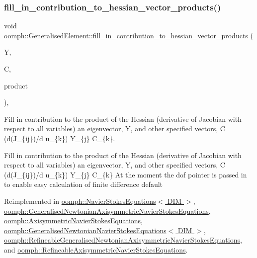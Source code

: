 \subsubsection{\texorpdfstring{fill\+\_\+in\+\_\+contribution\+\_\+to\+\_\+hessian\+\_\+vector\+\_\+products()}{fill\_in\_contribution\_to\_hessian\_vector\_products()}}
{\footnotesize\ttfamily void oomph\+::\+Generalised\+Element\+::fill\+\_\+in\+\_\+contribution\+\_\+to\+\_\+hessian\+\_\+vector\+\_\+products (\begin{DoxyParamCaption}\item[{\hyperlink{classoomph_1_1Vector}{Vector}$<$ double $>$ const \&}]{Y,  }\item[{\hyperlink{classoomph_1_1DenseMatrix}{Dense\+Matrix}$<$ double $>$ const \&}]{C,  }\item[{\hyperlink{classoomph_1_1DenseMatrix}{Dense\+Matrix}$<$ double $>$ \&}]{product }\end{DoxyParamCaption})\hspace{0.3cm}{\ttfamily [protected]}, {\ttfamily [virtual]}}



Fill in contribution to the product of the Hessian (derivative of Jacobian with respect to all variables) an eigenvector, Y, and other specified vectors, C (d(J\+\_\+\{ij\})/d u\+\_\+\{k\}) Y\+\_\+\{j\} C\+\_\+\{k\}. 

Fill in contribution to the product of the Hessian (derivative of Jacobian with respect to all variables) an eigenvector, Y, and other specified vectors, C (d(J\+\_\+\{ij\})/d u\+\_\+\{k\}) Y\+\_\+\{j\} C\+\_\+\{k\} At the moment the dof pointer is passed in to enable easy calculation of finite difference default 

Reimplemented in \hyperlink{classoomph_1_1NavierStokesEquations_a2bb1a43a7f60aafbfd2de233b539c3f0}{oomph\+::\+Navier\+Stokes\+Equations$<$ D\+I\+M $>$}, \hyperlink{classoomph_1_1GeneralisedNewtonianAxisymmetricNavierStokesEquations_a2087bbf2d46364b9dc414a7ca90f25de}{oomph\+::\+Generalised\+Newtonian\+Axisymmetric\+Navier\+Stokes\+Equations}, \hyperlink{classoomph_1_1AxisymmetricNavierStokesEquations_a295dab32c432e6f2597db7aa78c306d9}{oomph\+::\+Axisymmetric\+Navier\+Stokes\+Equations}, \hyperlink{classoomph_1_1GeneralisedNewtonianNavierStokesEquations_af994107ca05228c14a8e63ae8793f4c3}{oomph\+::\+Generalised\+Newtonian\+Navier\+Stokes\+Equations$<$ D\+I\+M $>$}, \hyperlink{classoomph_1_1RefineableGeneralisedNewtonianAxisymmetricNavierStokesEquations_a7794ad4a3ea19be7604d7c8884debe70}{oomph\+::\+Refineable\+Generalised\+Newtonian\+Axisymmetric\+Navier\+Stokes\+Equations}, and \hyperlink{classoomph_1_1RefineableAxisymmetricNavierStokesEquations_aceeb8beea173139f943043d2dd47bb19}{oomph\+::\+Refineable\+Axisymmetric\+Navier\+Stokes\+Equations}.



